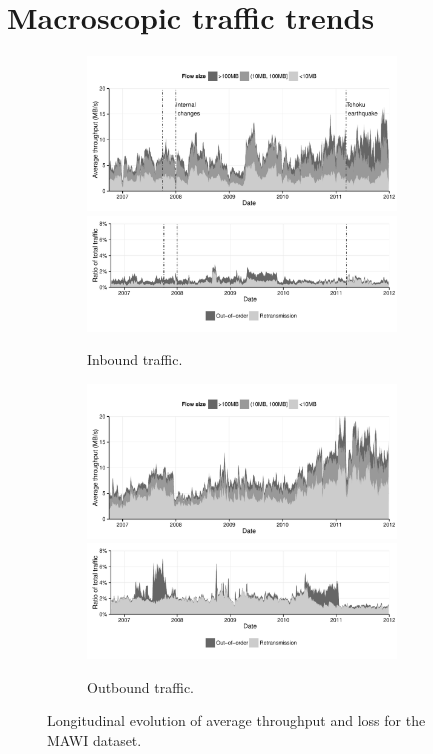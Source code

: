\section{Macroscopic traffic trends}
\label{section:malawi:macro}

\begin{figure}
  \centering
  \begin{subfigure}[b]{1.0\linewidth}
  \includegraphics[width=0.9\textwidth]{figures/malawi/tputin}\\
  \includegraphics[width=0.9\textwidth]{figures/malawi/lossesin}
  \caption{Inbound traffic.\label{fig:MAWIin}}
  \end{subfigure}
  \begin{subfigure}[b]{1.0\linewidth}
  \includegraphics[width=0.9\textwidth]{figures/malawi/tputout}\\
  \includegraphics[width=0.9\textwidth]{figures/malawi/lossesout}
  \caption{Outbound traffic.\label{fig:MAWIout}}
  \end{subfigure}
  \caption{Longitudinal evolution of average throughput and loss for the \acs{MAWI} dataset.}\label{fig:MAWI}
\end{figure}

